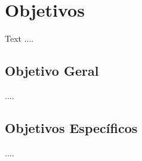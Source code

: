 \chapter{Objetivos}
\label{cha:objetivos}

Text ....

\section{Objetivo Geral}

....

\section{Objetivos Específicos}


....


